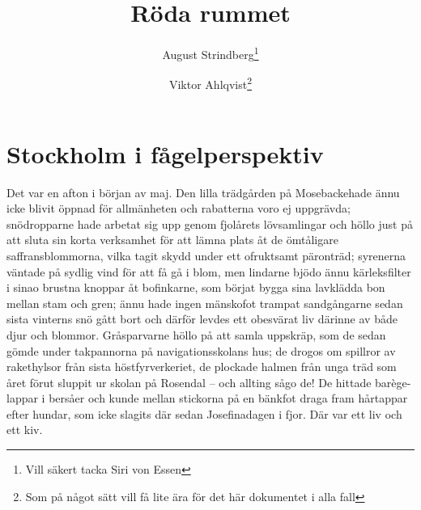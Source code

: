 \documentclass[%
	11pt,			%
	swedish,		%
	]{article}
\title{Röda rummet}
\author{August Strindberg\thanks{Vill säkert tacka Siri von Essen} \and Viktor Ahlqvist\thanks{Som på något sätt vill få lite ära för det här dokumentet i alla fall}}
\begin{document}
\maketitle 				%
\tableofcontents		%

\section{Stockholm i fågelperspektiv}
Det var en afton i början av maj. Den lilla trädgården på Mosebackehade ännu 
icke blivit öppnad för allmänheten och rabatterna voro ej uppgrävda; 
snödropparne hade arbetat sig upp genom fjolårets lövsamlingar och höllo just 
på att sluta sin korta verksamhet för att lämna plats åt de ömtåligare 
saffransblommorna, vilka tagit skydd under ett ofruktsamt päronträd; syrenerna 
väntade på sydlig vind för att få gå i blom, men lindarne bjödo ännu 
kärleksfilter i sinao brustna knoppar åt bofinkarne, som börjat bygga sina 
lavklädda bon mellan stam och gren; ännu hade ingen mänskofot trampat 
sandgångarne sedan sista vinterns snö gått bort och därför levdes ett obesvärat 
liv därinne av både djur och blommor. Gråsparvarne höllo på att samla uppskräp, 
som de sedan gömde under takpannorna på navigationsskolans hus; de drogos om 
spillror av rakethylsor från sista höstfyrverkeriet, de plockade halmen från 
unga träd som året förut sluppit ur skolan på Rosendal -- och allting sågo de! 
De hittade barège-lappar i bersåer och kunde mellan stickorna på en bänkfot 
draga fram hårtappar efter hundar, som icke slagits där sedan Josefinadagen i 
fjor. Där var ett liv och ett kiv.
\end{document}
